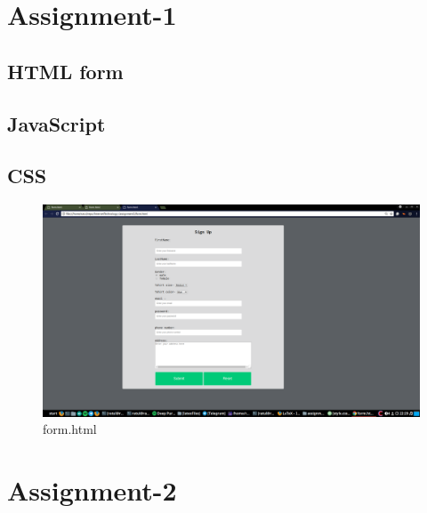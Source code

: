 \documentclass[a4paper,16pt]{article}
\begin{document}
	{
		\doublespacing
		{
			\renewcommand\contentsname{\Huge Contents}
			\renewcommand\cftsecfont{\LARGE}
			
			\renewcommand\cftsubsecfont{\Large}
			
			\doublespacing
			\tableofcontents
			\doublespacing
		}
	}
	\newpage
	\section{Assignment-1}
	\subsection{HTML form}
	\vspace{0.2in}
	
	\subsection{JavaScript}
	
	\subsection{CSS}
	
	\begin{figure}[h!]
		\includegraphics*[scale=0.25,width=1\linewidth]{code/form.png}
		\caption{\large form.html}
	\end{figure}
	\clearpage
	\section{Assignment-2}
\end{document}
